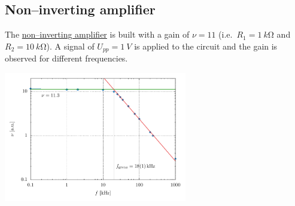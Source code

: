 \documentclass[a4paper,10pt]{article}
\newenvironment{Figure}
        {\par\medskip\noindent\minipage{\linewidth}}
        {\endminipage\par\medskip}
\numberwithin{equation}{section}
\begin{document}
\begin{multicols}{2}
        \subsection{Non--inverting amplifier}
        The \hyperref[fig:non--inverting amplifier]{non--inverting amplifier} is built with a gain of $\nu =11$ (i.e.\ $R_1=\SI{1}{k\ohm}$ and $R_2=\SI{10}{k\ohm}$).
        A signal of $U_{p p}=\SI{1}{V}$ is applied to the circuit and the gain is observed for different frequencies.
        \begin{Figure}
                \centering
                \includegraphics[width=0.6\textwidth]{../plot/5_1_2_crop.pdf}
        \end{Figure}
\end{multicols}

\clearpage
\listoffigures
\listoftables



\end{document}
